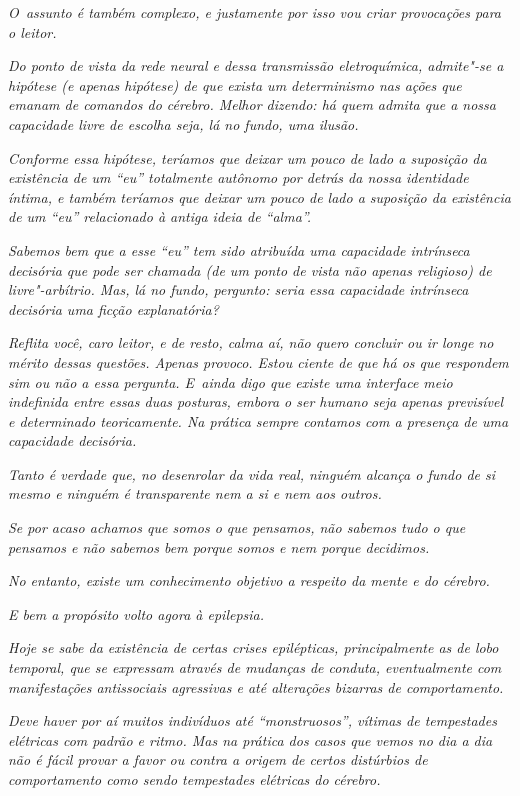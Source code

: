 \emph{O~assunto é também complexo, e justamente por isso vou criar
provocações para o leitor.}~

\emph{Do ponto de vista da rede neural e dessa transmissão
eletroquímica, admite"-se a hipótese (e apenas hipótese) de que exista um
determinismo nas ações que emanam de comandos do cérebro. Melhor
dizendo: há quem admita que a nossa capacidade livre de escolha seja, lá
no fundo, uma ilusão.}~

\emph{Conforme essa hipótese, teríamos que deixar um pouco de lado a
suposição da existência de um ``eu'' totalmente autônomo por detrás da
nossa identidade íntima, e também teríamos que deixar um pouco de lado a
suposição da existência de um ``eu'' relacionado à antiga ideia de
``alma''.}~

\emph{Sabemos bem que a esse ``eu'' tem sido atribuída uma capacidade
intrínseca decisória que pode ser chamada (de um ponto de vista não
apenas religioso) de livre"-arbítrio. Mas, lá no fundo, pergunto: seria
essa capacidade intrínseca decisória uma ficção explanatória?}~

\emph{Reflita você, caro leitor, e de resto, calma aí, não quero
concluir ou ir longe no mérito dessas questões. Apenas provoco. Estou
ciente de que há os que respondem sim ou não a essa pergunta. E~ainda
digo que existe uma interface meio indefinida entre essas duas posturas,
embora o ser humano seja apenas previsível e determinado teoricamente.
Na prática sempre contamos com a presença de uma capacidade decisória.}~

\emph{Tanto é verdade que, no desenrolar da vida real, ninguém alcança o
fundo de si mesmo e ninguém é transparente nem a si e nem aos outros.}~

\emph{Se por acaso achamos que somos o que pensamos, não sabemos tudo o
que pensamos e não sabemos bem porque somos e nem porque decidimos.}~

\emph{No entanto, existe um conhecimento objetivo a respeito da mente e
do cérebro.}~

\emph{E bem a propósito volto agora à epilepsia.}~

\emph{Hoje se sabe da existência de certas crises epilépticas,
principalmente as de lobo temporal, que se expressam através de mudanças
de conduta, eventualmente com manifestações antissociais agressivas e
até alterações bizarras de comportamento.}~

\emph{Deve haver por aí muitos indivíduos até ``monstruosos'', vítimas de
tempestades elétricas com padrão e ritmo. Mas na prática dos casos que
vemos no dia a dia não é fácil provar a favor ou contra a origem de
certos distúrbios de comportamento como sendo tempestades elétricas do
cérebro.}~

